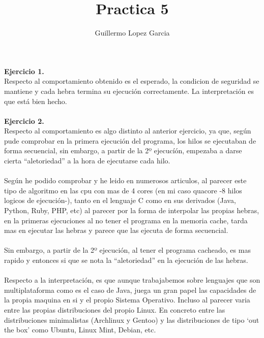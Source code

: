 \documentclass{minimal}
\title{Practica 5}
\author{Guillermo Lopez Garcia}
\begin{document}
\maketitle

\textbf{Ejercicio 1.} \\
Respecto al comportamiento obtenido es el esperado, la condicion de seguridad se mantiene y
cada hebra termina su ejecución correctamente. La interpretación es que está bien hecho. \\

\\

\textbf{Ejercicio 2.} \\
Respecto al comportamiento es algo distinto al anterior ejercicio, ya que, según pude 
comprobar en la primera ejecución del programa, los hilos se ejecutaban de forma 
secuencial, sin embargo, a partir de la 2º ejecucíón, empezaba a darse cierta ``aletoriedad'' 
a la hora de ejecutarse cada hilo. \\
\\
Según he podido comprobar y he leido en numerosos articulos, al parecer este tipo de algoritmo 
en las cpu con mas de 4 cores (en mi caso quacore -8 hilos logicos de ejecución-), tanto en 
el lenguaje C como en sus derivados (Java, Python, Ruby, PHP, etc) al parecer por la forma de 
interpolar las propias hebras, en la primeras ejecuciones al no tener el programa en la memoria 
cache, tarda mas en ejecutar las hebras y parece que las ejecuta de forma secuencial.\\
\\
Sin embargo, a partir de la 2º ejecución, al tener el programa cacheado, es mas rapido y entonces
si que se nota la ``aletoriedad'' en la ejecución de las hebras.\\
\\
Respecto a la interpretación, es que aunque trabajabemos sobre lenguajes que son multiplataforma
como es el caso de Java, juega un gran papel las capacidades de la propia maquina en si y 
el propio Sistema Operativo. Incluso al parecer varia entre las propias distribuciones del propio
Linux. En concreto entre las distribuciones minimalistas (Archlinux y Gentoo) y las distribuciones
de tipo `out the box' como Ubuntu, Linux Mint, Debian, etc.
\end{document}
